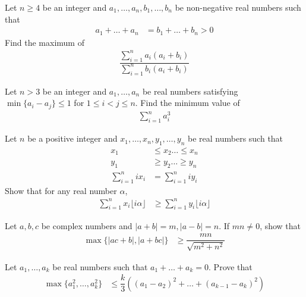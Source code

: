 \documentclass{subfile}
\begin{document}
		\begin{problem}[$2011$, problem $5$]
			Let $n\geq4$ be an integer and $a_{1},\ldots,a_{n},b_{1},\ldots,b_{n}$ be non-negative real numbers such that
				\begin{align*}
					a_{1}+\ldots+a_{n}
						& = b_{1}+\ldots+b_{n}>0
				\end{align*}
			Find the maximum of
				\begin{align*}
					\dfrac{\sum_{i=1}^{n}a_{i}(a_{i}+b_{i})}{\sum_{i=1}^{n}b_{i}(a_{i}+b_{i})}
				\end{align*}
		\end{problem}
	
		\begin{problem}[$2009$, problem $4$]
			Let $n>3$ be an integer and $a_{1},\ldots,a_{n}$ be real numbers satisfying $\min\{a_{i}-a_{j}\}\leq1$ for $1\leq i<j\leq n$. Find the minimum value of
				\begin{align*}
					\sum_{i=1}^{n}a_{i}^{3}
				\end{align*}
		\end{problem}
	
		\begin{problem}[$2008$, problem $3$]
			Let $n$ be a positive integer and $x_{1},\ldots,x_{n},y_{1},\ldots,y_{n}$ be real numbers such that
				\begin{align*}
					x_{1}
						& \leq x_{2}\ldots\leq x_{n}\\
					y_{1}
						& \geq y_{2}\ldots\geq y_{n}\\
					\sum_{i=1}^{n}ix_{i}
						& = \sum_{i=1}^{n}iy_{i}
				\end{align*}
			Show that for any real number $\alpha$,
				\begin{align*}
					\sum_{i=1}^{n}x_{i}\lfloor i\alpha\rfloor
						& \geq\sum_{i=1}^{n}y_{i}\lfloor i\alpha\rfloor
				\end{align*}
		\end{problem}
	
		\begin{problem}[$2007$, problem $1$]
			Let $a,b,c$ be complex numbers and $|a+b|=m,|a-b|=n$. If $mn\neq0$, show that
				\begin{align*}
					\max\{|ac+b|,|a+bc|\}
						& \geq\dfrac{mn}{\sqrt{m^{2}+n^{2}}}
				\end{align*}
		\end{problem}
	
		\begin{problem}[$2006$, problem $1$]
			Let $a_{1},\ldots,a_{k}$ be real numbers such that $a_{1}+\ldots+a_{k}=0$. Prove that
				\begin{align*}
					\max\{a_{1}^{2},\ldots,a_{k}^{2}\}
						& \leq \dfrac{k}{3}\left((a_{1}-a_{2})^{2}+\ldots+(a_{k-1}-a_{k})^{2}\right)
				\end{align*}
		\end{problem}
	
\end{document}
